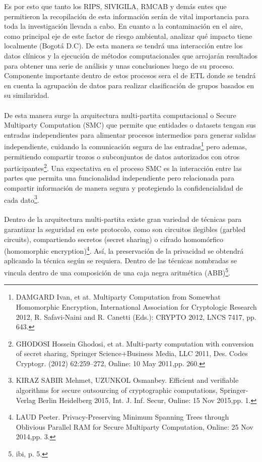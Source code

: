 \documentclass[a4paper,openright,12pt]{book}
\theoremstyle{definition}
\theoremstyle{remark}
\begin{document}
Es por esto que tanto los  RIPS, SIVIGILA, RMCAB y demás entes que permitieron la recopilación de esta información serán de vital importancia para toda la investigación llevada a cabo. En cuanto a la contaminación en el aire, como principal eje de este factor de riesgo ambiental, analizar qué impacto tiene localmente (Bogotá D.C). De esta manera se tendrá una interacción entre los datos clínicos y la ejecución de métodos computacionales que arrojarán resultados para obtener una serie de análisis y unas conclusiones luego de su proceso. Componente importante dentro de estos procesos sera el de ETL donde se tendrá en cuenta la agrupación de datos para realizar clasificación de grupos basados en su similaridad. \\\\
De esta manera surge la arquitectura multi-partita computacional o  Secure Multiparty Computation (SMC) que permite que entidades o datasets tengan sus entradas independientes para alimentar procesos intermedios para generar salidas independiente, cuidando la comunicación segura de las entradas\footnote{DAMGARD Ivan, et at. Multiparty Computation from Somewhat Homomorphic Encryption, International Association for Cryptologic Research 2012, R. Safavi-Naini and R. Canetti (Eds.): CRYPTO 2012, LNCS 7417, pp. 643.} pero ademas, permitiendo compartir trozos o subconjuntos de datos autorizados con otros participantes\footnote{GHODOSI Hossein Ghodosi, et at. Multi-party computation with conversion of secret sharing, Springer Science+Business Media, LLC 2011, Des. Codes Cryptogr. (2012) 62:259–272, Online: 10 May 2011,pp. 260.}. Una expectativa en el proceso SMC es la interacción entre las partes que permita una funcionalidad independiente pero relacionada para compartir información de manera segura y protegiendo la confidencialidad de cada dato\footnote{KIRAZ SABIR Mehmet, UZUNKOL Osmanbey. Efficient and verifiable algorithms for secure outsourcing of cryptographic computations, Springer-Verlag Berlin Heidelberg 2015, Int. J. Inf. Secur, Online: 15 Nov 2015,pp. 1.}.  \\\\
Dentro de la arquitectura multi-partita existe gran variedad de técnicas para garantizar la seguridad en este protocolo, como son circuitos ilegibles (garbled circuits), compartiendo secretos (secret sharing) o cifrado homomórfico (homomorphic encryption)\footnote{LAUD Peeter. Privacy-Preserving Minimum Spanning Trees through Oblivious Parallel RAM for Secure Multiparty Computation, Online: 25 Nov 2014,pp. 3.}. Así, la preservación de la privacidad se obtendrá aplicando la técnica según se requiera. Dentro de las técnicas nombradas se vincula dentro de una composición de una caja negra aritmética (ABB)\footnote{ibi, p. 5.}.
\end{document}
